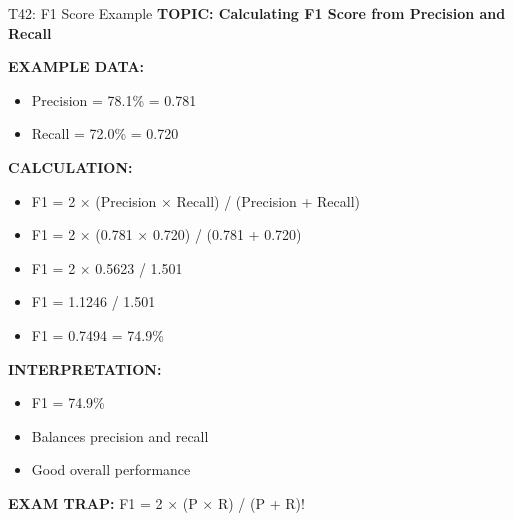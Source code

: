 \documentclass[8pt]{beamer}
\begin{document}
	\begin{frame}{T42: F1 Score Example}
		\fontsize{6.5}{7.5}\selectfont
		\textbf{TOPIC: Calculating F1 Score from Precision and Recall}
		
		\vspace{0.1cm}
		\textbf{EXAMPLE DATA:}
		\begin{itemize}
			\item Precision = 78.1\% = 0.781
			\item Recall = 72.0\% = 0.720
		\end{itemize}
		
		\vspace{0.1cm}
		\textbf{CALCULATION:}
		\begin{itemize}
			\item F1 = 2 × (Precision × Recall) / (Precision + Recall)
			\item F1 = 2 × (0.781 × 0.720) / (0.781 + 0.720)
			\item F1 = 2 × 0.5623 / 1.501
			\item F1 = 1.1246 / 1.501
			\item F1 = 0.7494 = 74.9\%
		\end{itemize}
		
		\vspace{0.1cm}
		\textbf{INTERPRETATION:}
		\begin{itemize}
			\item F1 = 74.9\%
			\item Balances precision and recall
			\item Good overall performance
		\end{itemize}
		
		\textcolor{myred}{\textbf{EXAM TRAP:}} F1 = \textcolor{myblue}{2 × (P × R) / (P + R)}!
	\end{frame}
	
\end{document}
